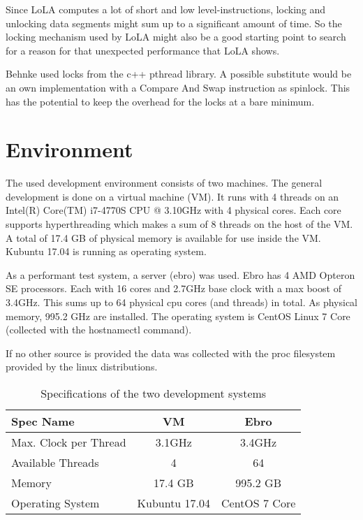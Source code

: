 Since LoLA computes a lot of short and low level-instructions, locking and unlocking data segments might sum up to a significant amount of time. So the locking mechanism used by LoLA might also be a good starting point to search for a reason for that unexpected performance that LoLA shows.

Behnke used locks from the c++ pthread library. A possible substitute would be an own implementation with a Compare And Swap instruction as spinlock. This has the potential to keep the overhead for the locks at a bare minimum.

\section{Environment}
\label{env}
The used development environment consists of two machines. The general development is done on a virtual machine (VM). It runs with 4 threads on an Intel(R) Core(TM) i7-4770S CPU @ 3.10GHz with 4 physical cores. Each core supports hyperthreading which makes a sum of 8 threads on the host of the VM. A total of 17.4 GB of physical memory is available for use inside the VM. Kubuntu 17.04 is running as operating system.

As a performant test system, a server (ebro) was used. Ebro has 4 AMD Opteron SE processors. Each with 16 cores and 2.7GHz base clock with a max boost of 3.4GHz\cite{AMDSpecs}. This sums up to 64 physical cpu cores (and threads) in total. As physical memory, 995.2 GHz are installed. The operating system is CentOS Linux 7 Core (collected with the hostnamectl command).

If no other source is provided the data was collected with the proc filesystem provided by the linux distributions.
\begin{center}
    \begin{table}[H]
        \centering
        \begin{tabular}{ | l | c | c |}
            \hline
            \textbf{Spec Name} & \textbf{VM} & \textbf{Ebro} \\ \hline
            Max. Clock per Thread & 3.1GHz & 3.4GHz \\ 
            Available Threads & 4 & 64 \\ 
            Memory & 17.4 GB & 995.2 GB\\ 
            Operating System & Kubuntu 17.04 & CentOS 7 Core \\ \hline
        \end{tabular}
        \caption{Specifications of the two development systems}
    \end{table}
\end{center}


